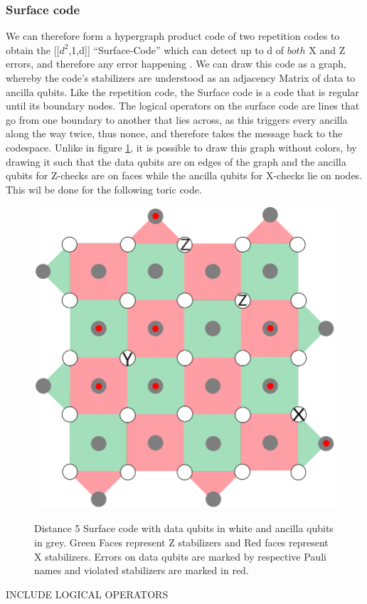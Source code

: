 \subsubsection{Surface code}
We can therefore form a hypergraph product code of two repetition
codes to
obtain the [[$d^2$,1,d]] ``Surface-Code'' which can detect up
to d of $both$ X and Z errors, and 
therefore any error happening \cite{joschka}.
We can draw this code as a graph, whereby the code's stabilizers
are understood as an adjacency Matrix of data to ancilla qubits.
Like the repetition code, the Surface code is a code that is regular until
its boundary nodes. 
The logical operators on the surface code are lines that go from one 
boundary to another that lies across, as this triggers every ancilla along
the way twice, thus nonce, and therefore takes the message back to the
codespace.
Unlike in figure \ref{fig: surface_code}, it is possible to draw this 
graph without colors, by drawing it such that the data qubits are on 
edges of the graph and the ancilla qubits for Z-checks are on faces
while the ancilla qubits for X-checks lie on nodes.
This wil be done for the following toric code.\\


\begin{figure}[h!]
	\begin{center}
	\captionsetup{justification=centering,margin=2cm}
	\includegraphics[scale=0.35]{./img/figures/d5surfaceCode.png}\\
	\caption{Distance 5 Surface code with data qubits in white and 
    ancilla qubits in grey. Green Faces represent Z stabilizers
    and Red faces represent X stabilizers.
    Errors on data qubits are marked
    by respective Pauli names and violated stabilizers are marked in red.}
	\label{fig: surface_code}
	\end{center}
\end{figure}


INCLUDE LOGICAL OPERATORS
\newpage